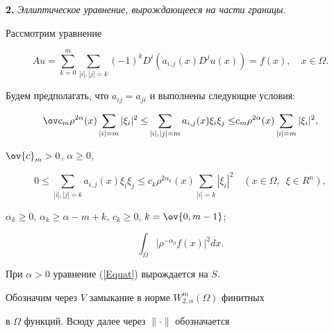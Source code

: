 {\bf 2.} {\it Эллиптическое уравнение, вырождающееся на части границы.} 


Рассмотрим уравнение


\begin{equation}


Au=\sum_{k=0}^m {\sum_{|i|,|j|=k} {(-1)^k


D^i(a_{i,j}(x)D^ju(x))}}=f(x), \quad x\in \Omega.


\label{Equat}


\end{equation}


Будем предполагать, что $a_{ij}=a_{ji}$ и выполнены следующие условия:


\begin{equation} \label{condam}


\ov c_m\rho ^{2\alpha }(x)\sum_{|i|=m} {|\xi _i|^2\le }\sum_{|i|,|j|=m} 


{a_{i,j}(x)\xi _i\xi _j\le }c_m\rho ^{2\alpha }(x)\sum_{|i|=m} {|\xi _i|^2}, 


\end{equation}


$\ov{c}_m >0$, $\alpha \geq 0$, 


\begin{equation} \label{condak}


0 \leq \sum_{|i|,|j|=k} {a_{i,j}(x)\xi _i\xi _j\le }c_k


\rho ^{2 \alpha_k }(x)\sum_{|i|=k} {|\xi _i|^2}


\quad (x \in \Omega,\ \; \xi \in R^n),


\end{equation}


$\alpha_k \geq 0$, $\alpha_k \geq \alpha-m+k$, $c_k \geq 0$, $k=\ov{0,m-1}$; 


\begin{equation} \label{condf}


\int_\Omega {|\rho ^{-\alpha _0}f(x)|^2dx}.


\end{equation}





При $\alpha > 0$ уравнение (\ref{Equat}) вырождается на $S$.





Обозначим через $V$ замыкание в норме $W_{2, \alpha}^m(\Omega)$ финитных 


в $\Omega$ функций. Всюду далее через $\| \cdot \|$ обозначается 



